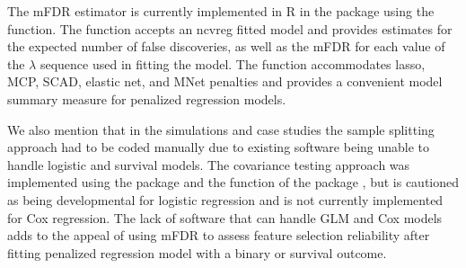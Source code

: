 The mFDR estimator is currently implemented in R in the  package \citep{Breheny2011} using the  function. The function accepts an ncvreg fitted model  and provides estimates for the expected number of false discoveries, as well as the mFDR for each value of the $\lambda$ sequence used in fitting the model. The function accommodates lasso, MCP, SCAD, elastic net, and MNet \citep{Huang2016} penalties and provides a convenient model summary measure for penalized regression models.

We also mention that in the simulations and case studies the sample splitting approach had to be coded manually due to existing software being unable to handle logistic and survival models. The covariance testing approach was implemented using the  package \citep{CovTest} and the  function of the  package \citep{Selective_Inference}, but is cautioned as being developmental for logistic regression and is not currently implemented for Cox regression. The lack of software that can handle GLM and Cox models adds to the appeal of using mFDR to assess feature selection reliability after fitting penalized regression model with a binary or survival outcome.
